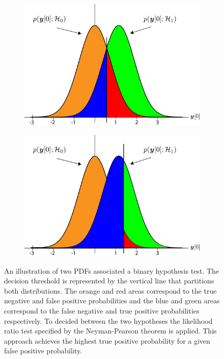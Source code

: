 \begin{figure}[htbp]
    \centering
    \begin{subfigure}{0.48\textwidth}
        \includegraphics[width=\textwidth]{figs/Chapter-4/230523_detection_theory.png}
        \caption{}
    \end{subfigure}
    \hfill
    \begin{subfigure}{0.48\textwidth}
        \includegraphics[width=\textwidth]{figs/Chapter-4/230523_detection_theory2.png}
        \caption{}
    \end{subfigure}
    \caption{An illustration of two PDFs associated a binary hypothesis test. The decision threshold is represented by the vertical line that partitions both distributions. The orange and red areas correspond to the true negative and false positive probabilities and the blue and green areas correspond to the false negative and true positive probabilities respectively. To decided between the two hypotheses the likelihood ratio test specified by the Neyman-Pearson theorem is applied. This approach achieves the highest true positive probability for a given false positive probability.}
    \label{fig:chap4-detection-threshold}
\end{figure}
